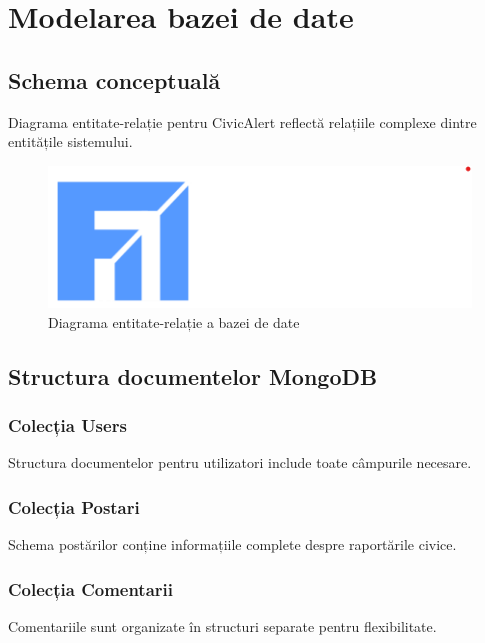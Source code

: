 \documentclass[12pt,a4paper]{report}
\begin{document}
\section{Modelarea bazei de date}

\subsection{Schema conceptuală}

Diagrama entitate-relație pentru CivicAlert reflectă relațiile complexe dintre entitățile sistemului.

\begin{figure}[H]
\centering
\includegraphics[width=1.0\textwidth]{logo_uaic.png}
\caption{Diagrama entitate-relație a bazei de date}
\label{fig:er_diagram}
\end{figure}

\subsection{Structura documentelor MongoDB}

\subsubsection{Colecția Users}

Structura documentelor pentru utilizatori include toate câmpurile necesare.

\subsubsection{Colecția Postari}

Schema postărilor conține informațiile complete despre raportările civice.

\subsubsection{Colecția Comentarii}

Comentariile sunt organizate în structuri separate pentru flexibilitate.
\end{document}
